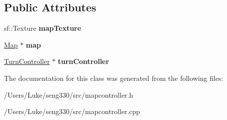 \subsection*{Public Attributes}
\begin{DoxyCompactItemize}
\item 
\hypertarget{class_map_controller_a1ae9ff76511baabf2d5c61133b6d5246}{}sf\+::\+Texture {\bfseries map\+Texture}\label{class_map_controller_a1ae9ff76511baabf2d5c61133b6d5246}

\item 
\hypertarget{class_map_controller_a136fc0bac51b7171f3e31505c6b90a34}{}\hyperlink{class_map}{Map} $\ast$ {\bfseries map}\label{class_map_controller_a136fc0bac51b7171f3e31505c6b90a34}

\item 
\hypertarget{class_map_controller_ac32c7f2abafb9c002cf746cf761afc56}{}\hyperlink{class_turn_controller}{Turn\+Controller} $\ast$ {\bfseries turn\+Controller}\label{class_map_controller_ac32c7f2abafb9c002cf746cf761afc56}

\end{DoxyCompactItemize}


The documentation for this class was generated from the following files\+:\begin{DoxyCompactItemize}
\item 
/\+Users/\+Luke/seng330/src/mapcontroller.\+h\item 
/\+Users/\+Luke/seng330/src/mapcontroller.\+cpp\end{DoxyCompactItemize}
